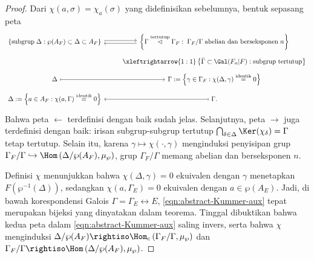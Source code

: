 \begin{proof}
	Dari $\chi(a, \sigma) = \chi_a(\sigma)$ yang didefinisikan sebelumnya, bentuk sepasang peta
	\begin{equation}\label{eqn:abstract-Kummer-aux} \begin{tikzcd}[row sep=tiny]
		\left\{ \text{subgrup}\; \Delta: \wp(A_F) \subset \Delta \subset A_F \right\} \arrow[r, yshift=0.5ex] & \left\{ \Gamma \stackrel{\text{tertutup}}{\lhd} \Gamma_F: \; \Gamma_F/\Gamma \;\text{abelian dan berseksponen}\; n  \right\} \arrow[l, yshift=-0.5ex] \\
		& \xleftrightarrow{1:1} \left\{ \bar{\Gamma} \subset \Gal(F_n|F) : \text{subgrup tertutup} \right\} \\
		\Delta \arrow[mapsto]{r} & \Gamma := \left\{\gamma \in \Gamma_F: \chi(\Delta, \gamma) \stackrel{\text{identik}}{=} 0 \right\}  \\
		\Delta := \left\{a \in A_F: \chi(a, \Gamma) \stackrel{\text{identik}}{=} 0 \right\} & \Gamma \arrow[mapsto]{l}.
	\end{tikzcd}\end{equation}
	Bahwa peta $\leftarrow$ terdefinisi dengan baik sudah jelas. Selanjutnya, peta $\rightarrow$ juga terdefinisi dengan baik: irisan subgrup-subgrup tertutup $\bigcap_{\delta \in \Delta} \Ker(\chi_\delta) = \Gamma$ tetap tertutup. Selain itu, karena $\gamma \mapsto \chi(\cdot, \gamma)$ menginduksi penyisipan grup $\Gamma_F/\Gamma \hookrightarrow \Hom\left( \Delta/\wp(A_F), \mu_\wp \right)$, grup $\Gamma_F/\Gamma$ memang abelian dan berseksponen $n$.

	Definisi $\chi$ menunjukkan bahwa $\chi(\Delta, \gamma) = 0$ ekuivalen dengan $\gamma$ menetapkan $F(\wp^{-1}(\Delta))$, sedangkan $\chi(a, \Gamma_E) = 0$ ekuivalen dengan $a \in \wp(A_E)$. Jadi, di bawah korespondensi Galois $\Gamma = \Gamma_E \leftrightarrow E$, \eqref{eqn:abstract-Kummer-aux} tepat merupakan bijeksi yang dinyatakan dalam teorema. Tinggal dibuktikan bahwa kedua peta dalam \eqref{eqn:abstract-Kummer-aux} saling invers, serta bahwa $\chi$ menginduksi $\Delta/\wp(A_F) \rightiso \Hom_{\text{c}}\left( \Gamma_F/\Gamma, \mu_\wp \right)$ dan $\Gamma_F/\Gamma \rightiso \Hom\left( \Delta/\wp(A_F), \mu_\wp \right)$.
	

\end{proof}
